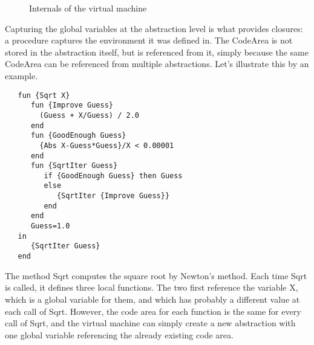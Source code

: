 \documentclass[a4paper]{memoir}
\begin{document}
\begin{figure}[h]
\caption{Internals of the virtual machine}
\end{figure}
Capturing the global variables at the abstraction level is what provides
closures: a procedure captures the environment it was defined in.
The CodeArea is not stored in the abstraction itself, but is referenced from
it, simply because the same CodeArea can be referenced from multiple
abstractions. Let's illustrate this by an example. 


\begin{lstlisting}
   fun {Sqrt X}
      fun {Improve Guess}
        (Guess + X/Guess) / 2.0
      end
      fun {GoodEnough Guess}
        {Abs X-Guess*Guess}/X < 0.00001
      end
      fun {SqrtIter Guess}
         if {GoodEnough Guess} then Guess
         else
            {SqrtIter {Improve Guess}}
         end
      end
      Guess=1.0
   in
      {SqrtIter Guess}
   end
\end{lstlisting}
The method Sqrt computes the square root by Newton's method. Each time Sqrt is
called, it defines three local functions. The two first reference the variable
X, which is a global variable for them, and which has probably a different
value at each call of Sqrt. However, the code area for each function is the
same for every call of Sqrt, and the virtual machine can simply create a new
abstraction with one global variable referencing the already existing code
area. 
\end{document}
